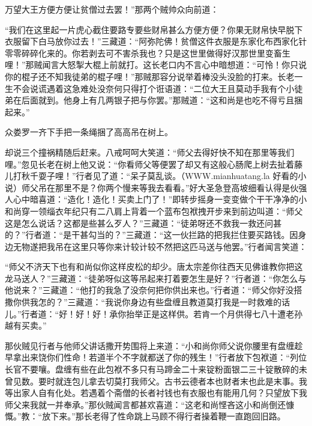 \documentclass[12pt,UTF8]{ctexbook}
\begin{document}
万望大王方便方便让贫僧过去罢！”那两个贼帅众向前道：

“我们在这里起一片虎心截住要路专要些财帛甚么方便方便？你果无财帛快早脱下衣服留下白马放你过去！”三藏道：“阿弥陀佛！贫僧这件衣服是东家化布西家化针零零碎碎化来的。你若剥去可不害杀我也？只是这世里做得好汉那世里变畜生哩！”那贼闻言大怒掣大棍上前就打。这长老口内不言心中暗想道：“可怜！你只说你的棍子还不知我徒弟的棍子哩！”那贼那容分说举着棒没头没脸的打来。长老一生不会说谎遇着这急难处没奈何只得打个诳语道：“二位大王且莫动手我有个小徒弟在后面就到。他身上有几两银子把与你罢。”那贼道：“这和尚是也吃不得亏且捆起来。”

众娄罗一齐下手把一条绳捆了高高吊在树上。

却说三个撞祸精随后赶来。八戒呵呵大笑道：“师父去得好快不知在那里等我们哩。”忽见长老在树上他又说：“你看师父等便罢了却又有这般心肠爬上树去扯着藤儿打秋千耍子哩！”行者见了道：“呆子莫乱谈。（WWW.mianhuatang.la 好看的小说）师父吊在那里不是？你两个慢来等我去看看。”好大圣急登高坡细看认得是伙强人心中暗喜道：“造化！造化！买卖上门了！”即转步摇身一变变做个干干净净的小和尚穿一领缁衣年纪只有二八肩上背着一个蓝布包袱拽开步来到前边叫道：“师父这是怎么说话？这都是些甚么歹人？”三藏道：“徒弟呀还不救我一救还问甚的？”行者道：“是干甚勾当的？”三藏道：“这一伙拦路的把我拦住要买路钱。因身边无物遂把我吊在这里只等你来计较计较不然把这匹马送与他罢。”行者闻言笑道：

“师父不济天下也有和尚似你这样皮松的却少。唐太宗差你往西天见佛谁教你把这龙马送人？”三藏道：“徒弟呀似这等吊起来打着要怎生是好？”行者道：“你怎么与他说来？”三藏道：“他打的我急了没奈何把你供出来也。”行者道：“师父你好没搭撒你供我怎的？”三藏道：“我说你身边有些盘缠且教道莫打我是一时救难的话儿。”行者道：“好！好！好！承你抬举正是这样供。若肯一个月供得七八十遭老孙越有买卖。”

那伙贼见行者与他师父讲话撒开势围将上来道：“小和尚你师父说你腰里有盘缠趁早拿出来饶你们性命！若道半个不字就都送了你的残生！”行者放下包袱道：“列位长官不要嚷。盘缠有些在此包袱不多只有马蹄金二十来锭粉面银二三十锭散碎的未曾见数。要时就连包儿拿去切莫打我师父。古书云德者本也财者末也此是末事。我等出家人自有化处。若遇着个斋僧的长者衬钱也有衣服也有能用几何？只望放下我师父来我就一并奉承。”那伙贼闻言都甚欢喜道：“这老和尚悭吝这小和尚倒还慷慨。”教：“放下来。”那长老得了性命跳上马顾不得行者操着鞭一直跑回旧路。
\end{document}
